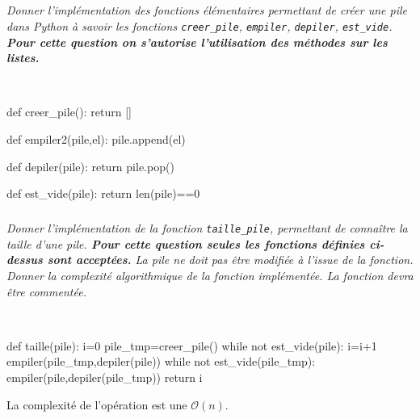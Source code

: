 \documentclass[10pt,fleqn]{article} %
\begin{document}
\subparagraph{}
\textit{Donner l'implémentation des fonctions élémentaires permettant de créer une pile dans Python à savoir les fonctions \texttt{creer\_pile}, \texttt{empiler}, \texttt{depiler}, \texttt{est\_vide}. \textbf{Pour cette question on s'autorise l'utilisation des méthodes sur les listes.}}
\ifprof
\begin{corrige}
~\\
\begin{minipage}[c]{.95\linewidth}
\begin{minipage}[c]{.2\linewidth}
\begin{python}
def creer_pile():
    return []
\end{python}
\end{minipage}\hfill
\begin{minipage}[c]{.2\linewidth}
\begin{python}
def empiler2(pile,el):
    pile.append(el)
\end{python}
\end{minipage}\hfill
\begin{minipage}[c]{.2\linewidth}
\begin{python} 
def depiler(pile):
    return pile.pop()
\end{python}
\end{minipage}\hfill
\begin{minipage}[c]{.2\linewidth}
\begin{python}
def est_vide(pile):
    return len(pile)==0
\end{python}
\end{minipage}
\end{minipage}
\end{corrige}
\else
\fi

\subparagraph{}
\textit{Donner l'implémentation de la fonction \texttt{taille\_pile}, permettant de connaître la taille d'une pile. \textbf{Pour cette question seules les fonctions définies ci-dessus sont acceptées.} La pile ne doit pas être modifiée à l'issue de la fonction. Donner la complexité algorithmique de la fonction implémentée. La fonction devra être commentée.}
\ifprof
\begin{corrige}    ~\\
\begin{python}
def taille(pile):
    i=0
    pile_tmp=creer_pile()
    while not est_vide(pile):
        i=i+1
        empiler(pile_tmp,depiler(pile))
    while not est_vide(pile_tmp):
        empiler(pile,depiler(pile_tmp))
    return i
\end{python}
La complexité de l'opération est une $\mathcal{O}(n)$.
\end{corrige}
\else
\fi
\end{document}
